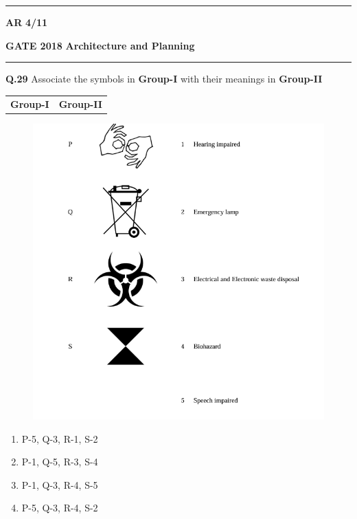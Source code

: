\documentclass[journal,12pt,onecolumn]{IEEEtran}
\theoremstyle{remark}
\begin{document}
 \noindent
\hrule \vspace{0.0875CM} \textbf{AR} \hfill  \textbf{4/11}

 \newpage
 
\noindent
\textbf{GATE 2018} \hfill \textbf{Architecture and Planning}
\vspace{0.0012cm} \hrule
\vspace{0.5cm}
\textbf{Q.29} \quad Associate the symbols in \textbf{Group-I} with their meanings in \textbf{Group-II}

\vspace{0.5cm}

\begin{tabular}{p{7cm} p{7cm}}
\centering \textbf{Group-I} & \centering \textbf{Group-II} \\
\end{tabular}


\begin{figure} [h!]
    \centering
    \includegraphics[width=1\linewidth]{Figs/29.png}
  \end{figure}

 

\begin{multicols}{2}
\begin{enumerate}[label=(\Alph*),leftmargin=1cm]
\item P-5, Q-3, R-1, S-2
\item P-1, Q-5, R-3, S-4
\item P-1, Q-3, R-4, S-5
\item P-5, Q-3, R-4, S-2
\end{enumerate}
\end{multicols}
\end{document}
